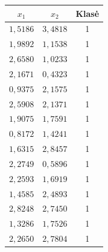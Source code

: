\begin{minipage}{0.45\textwidth}
    \centering
    \begin{tabular}{|c|c|c|}
        \hline
        $x_1$ & $x_2$ & Klasė \\
        \hline
        $1,5186$ & $3,4818$ & 1 \\ \hline
        $1,9892$ & $1,1538$ & 1 \\ \hline
        $2,6580$ & $1,0233$ & 1 \\ \hline
        $2,1671$ & $0,4323$ & 1 \\ \hline
        $0,9375$ & $2,1575$ & 1 \\ \hline
        $2,5908$ & $2,1371$ & 1 \\ \hline
        $1,9075$ & $1,7591$ & 1 \\ \hline
        $0,8172$ & $1,4241$ & 1 \\ \hline
        $1,6315$ & $2,8457$ & 1 \\ \hline
        $2,2749$ & $0,5896$ & 1 \\ \hline
        $2,2593$ & $1,6919$ & 1 \\ \hline
        $1,4585$ & $2,4893$ & 1 \\ \hline
        $2,8248$ & $2,7450$ & 1 \\ \hline
        $1,3286$ & $1,7526$ & 1 \\ \hline
        $2,2650$ & $2,7804$ & 1 \\ \hline
    \end{tabular}
    \label{tab:klase1}
\end{minipage}
